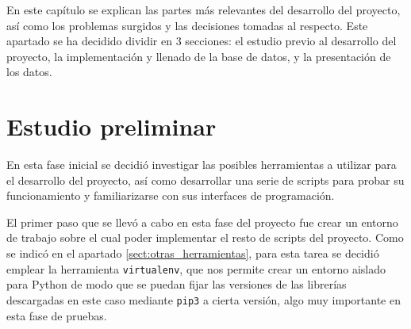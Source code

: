 

En este capítulo se explican las partes más relevantes del desarrollo del proyecto, así como los problemas surgidos y las decisiones tomadas al respecto. Este apartado se ha decidido dividir en 3 secciones: el estudio previo al desarrollo del proyecto, la implementación y llenado de la base de datos, y la presentación de los datos.

\section{Estudio preliminar}
\label{sect:estudio_preliminar}

En esta fase inicial se decidió investigar las posibles herramientas a utilizar para el desarrollo del proyecto, así como desarrollar una serie de scripts para probar su funcionamiento y familiarizarse con sus interfaces de programación.

El primer paso que se llevó a cabo en esta fase del proyecto fue crear un entorno de trabajo sobre el cual poder implementar el resto de scripts del proyecto. Como se indicó en el apartado \ref{sect:otras_herramientas}, para esta tarea se decidió emplear la herramienta \texttt{virtualenv}, que nos permite crear un entorno aislado para Python de modo que se puedan fijar las versiones de las librerías descargadas en este caso mediante \texttt{pip3} a cierta versión, algo muy importante en esta fase de pruebas.

